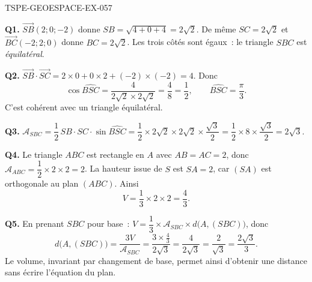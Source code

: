 \begin{corrige}{TSPE-GEOESPACE-EX-057}

\textbf{Q1.} $\vec{SB}(2;0;-2)$ donne $SB=\sqrt{4+0+4}=2\sqrt2$. De même
$SC=2\sqrt2$ et $\vec{BC}(-2;2;0)$ donne $BC=2\sqrt2$. Les trois côtés sont
égaux~: le triangle $SBC$ est \emph{équilatéral}.

\textbf{Q2.} $\vec{SB}\cdot\vec{SC}=2\times0+0\times2+(-2)\times(-2)=4$. Donc
\[
  \cos\widehat{BSC}=\frac{4}{2\sqrt2\times2\sqrt2}=\frac{4}{8}=\frac12,
  \qquad \widehat{BSC}=\frac{\pi}{3}.
\]
C'est cohérent avec un triangle équilatéral.

\textbf{Q3.} $\mathcal{A}_{SBC}=\dfrac12\,SB\cdot SC\cdot\sin\widehat{BSC}
=\dfrac12\times2\sqrt2\times2\sqrt2\times\dfrac{\sqrt3}{2}
=\dfrac12\times8\times\dfrac{\sqrt3}{2}=2\sqrt3$.

\textbf{Q4.} Le triangle $ABC$ est rectangle en $A$ avec $AB=AC=2$, donc
$\mathcal{A}_{ABC}=\dfrac12\times2\times2=2$. La hauteur issue de $S$ est
$SA=2$, car $(SA)$ est orthogonale au plan $(ABC)$. Ainsi
\[
  V=\frac13\times2\times2=\frac43 .
\]

\textbf{Q5.} En prenant $SBC$ pour base~:
$V=\dfrac13\times\mathcal{A}_{SBC}\times d\bigl(A,(SBC)\bigr)$, donc
\[
  d\bigl(A,(SBC)\bigr)=\frac{3V}{\mathcal{A}_{SBC}}
  =\frac{3\times\frac43}{2\sqrt3}=\frac{4}{2\sqrt3}
  =\frac{2}{\sqrt3}=\frac{2\sqrt3}{3}.
\]
Le volume, invariant par changement de base, permet ainsi d'obtenir une
distance sans écrire l'équation du plan.

\end{corrige}

%
%
%
%
%
%
